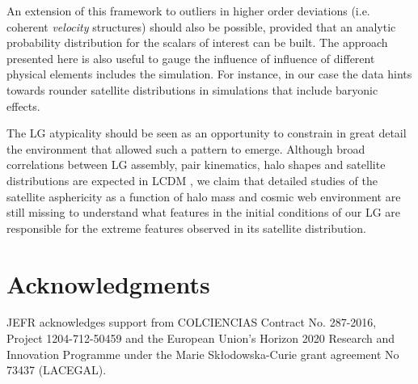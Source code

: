 \documentclass[a4paper,fleqn,usenatbib]{mnras}
\begin{document}
An extension of this framework to outliers in higher order deviations
(i.e. coherent \emph{velocity} structures) should also be possible, 
provided that an analytic probability distribution for the scalars of
interest can be built.  
The approach presented here is also useful to gauge the influence of 
influence of different physical elements includes the simulation. 
For instance, in our case the data hints towards rounder satellite
distributions in simulations that include baryonic effects.  

The LG atypicality should be seen as an opportunity to constrain in
great detail the environment that allowed such a pattern to emerge. 
Although broad correlations between LG assembly, pair kinematics, halo
shapes and satellite distributions are expected in LCDM
\citep{2011MNRAS.417.1434F,2014MNRAS.443.1090F,2015ApJ...799...45F,2015MNRAS.452.1052L},
we claim that detailed studies of the satellite asphericity as a
function of halo mass and cosmic web environment are still missing to
understand what features in the initial conditions of our LG are
responsible for the extreme features observed in its satellite
distribution. 

\section*{Acknowledgments} 
JEFR acknowledges support from COLCIENCIAS Contract No. 287-2016,
Project 1204-712-50459 and the European Union's Horizon 2020 Research and Innovation
Programme under the Marie Sk\l{}odowska-Curie grant agreement No 73437
(LACEGAL).   
  

%
\end{document}
